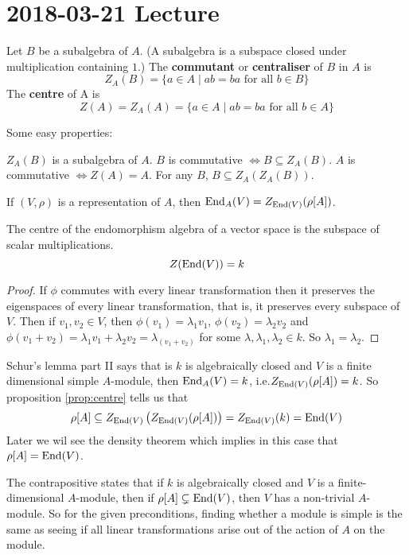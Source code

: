 \section{2018-03-21 Lecture}

\begin{defn}
	Let $B$ be a subalgebra of $A$.
	(A subalgebra is a subspace closed under multiplication containing $1$.)
	The \textbf{commutant} or \textbf{centraliser} of $B$ in $A$ is
	\[Z_A(B) = \{a \in A \mid ab=ba \text{ for all } b \in B\}\]
	The \textbf{centre} of A is
	\[Z(A) = Z_A(A) = \{a \in A \mid ab=ba \text{ for all } b \in A\}\]
\end{defn}

\begin{prop}\label{prop:centre}
	Some easy properties:
	\begin{itm}
		\io $Z_A(B)$ is a subalgebra of $A$.
		\io $B$ is commutative $\iff B \subseteq Z_A(B)$.
		\io $A$ is commutative $\iff Z(A)=A$.
		\io For any $B$, $B \subseteq Z_A(Z_A(B))$.
	\end{itm}
\end{prop}

\begin{exam}
	If $(V,\rho)$ is a representation of $A$, then $\operatorname{End}_A(V) = Z_{\operatorname{End}(V)}(\rho[A])$.
\end{exam}

\begin{lem}
	The centre of the endomorphism algebra of a vector space is the subspace of scalar multiplications.
	\[Z(\operatorname{End}(V))=k\]
\end{lem}

\begin{proof}
	If $\phi$ commutes with every linear transformation then it preserves the eigenspaces of every linear transformation, that is, it preserves every subspace of $V$.
	Then if $v_1,v_2 \in V$, then $\phi(v_1)=\lambda_1v_1$, $\phi(v_2)=\lambda_2v_2$ and $\phi(v_1+v_2)=\lambda_1v_1+\lambda_2v_2 = \lambda_(v_1+v_2)$ for some $\lambda,\lambda_1,\lambda_2 \in k$.
	So $\lambda_1=\lambda_2$.
\end{proof}

\begin{note}
	Schur's lemma part II says that is $k$ is algebraically closed and $V$ is a finite dimensional simple $A$-module, then $\operatorname{End}_A(V)=k$, i.e.\@ $Z_{\operatorname{End}(V)}(\rho[A])=k$.
	So proposition \ref{prop:centre} tells us that
	\[\rho[A] \subseteq Z_{\operatorname{End}(V)}\left(Z_{\operatorname{End}(V)}(\rho[A])\right) = Z_{\operatorname{End}(V)}(k) = \operatorname{End}(V)\]
	Later we wil see the density theorem which implies in this case that $\rho[A]=\operatorname{End}(V)$.
	
	The contrapositive states that if $k$ is algebraically closed and $V$ is a finite-dimensional $A$-module, then if $\rho[A] \subsetneq \operatorname{End}(V)$, then $V$ has a non-trivial $A$-module.
	So for the given preconditions, finding whether a module is simple is the same as seeing if all linear transformations arise out of the action of $A$ on the module.
\end{note}

